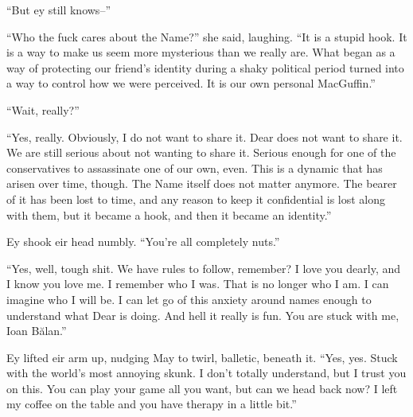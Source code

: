 ``But ey still knows--''

``Who the fuck cares about the Name?'' she said, laughing. ``It is a stupid hook. It is a way to make us seem more mysterious than we really are. What began as a way of protecting our friend's identity during a shaky political period turned into a way to control how we were perceived. It is our own personal MacGuffin.''

``Wait, really?''

``Yes, really. Obviously, I do not want to share it. Dear does not want to share it. We are still serious about not wanting to share it. Serious enough for one of the conservatives to assassinate one of our own, even. This is a dynamic that has arisen over time, though. The Name itself does not matter anymore. The bearer of it has been lost to time, and any reason to keep it confidential is lost along with them, but it became a hook, and then it became an identity.''

Ey shook eir head numbly. ``You're all completely nuts.''

``Yes, well, tough shit. We have rules to follow, remember? I love you dearly, and I know you love me. I remember who I was. That is no longer who I am. I can imagine who I will be. I can let go of this anxiety around names enough to understand what Dear is doing. And hell it really is fun. You are stuck with me, Ioan Bălan.''

Ey lifted eir arm up, nudging May to twirl, balletic, beneath it. ``Yes, yes. Stuck with the world's most annoying skunk. I don't totally understand, but I trust you on this. You can play your game all you want, but can we head back now? I left my coffee on the table and you have therapy in a little bit.''
